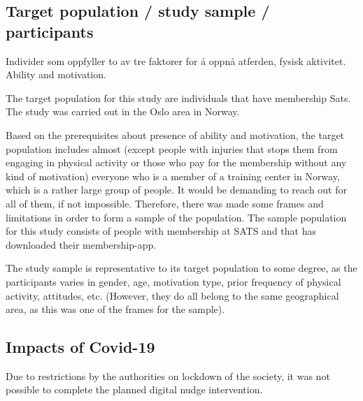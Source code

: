 \subsection{Target population / study sample / participants}
Individer som oppfyller to av tre faktorer for å oppnå atferden, fysisk aktivitet. Ability and motivation. 

The target population for this study are individuals that have membership Sats. The study was carried out in the Oslo area in Norway.  


Based on the prerequisites about presence of ability and motivation, the target population includes almost (except people with injuries that stops them from engaging in physical activity or those who pay for the membership without any kind of motivation) everyone who is a member of a training center in Norway, which is a rather large group of people. It would be demanding to reach out for all of them, if not impossible. Therefore, there was made some frames and limitations in order to form a sample of the population. The sample population for this study consists of people with membership at SATS and that has downloaded their membership-app. 
 
The study sample is representative to its target population to some degree, as the participants varies in gender, age, motivation type, prior frequency of physical activity, attitudes, etc. (However, they do all belong to the same geographical area, as this was one of the frames for the sample).


\subsection{Impacts of Covid-19}
Due to restrictions by the authorities on lockdown of the society, it was not possible to complete the planned digital nudge intervention. 




